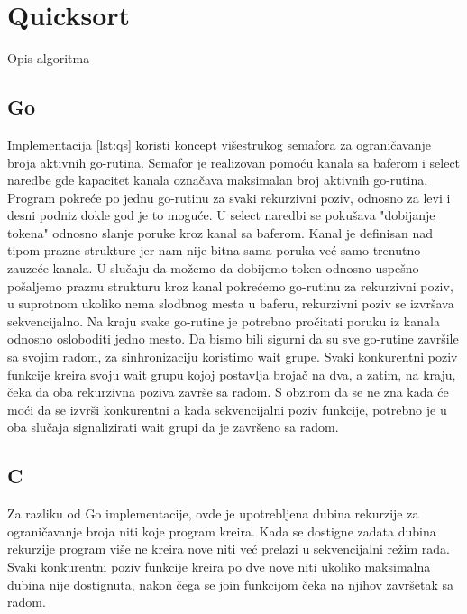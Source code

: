 \documentclass[12pt,oneside]{memoir}
\begin{document}
\section{Quicksort}
Opis algoritma

\subsection{Go}
Implementacija \ref{lst:qs} koristi koncept višestrukog semafora za ograničavanje broja aktivnih go-rutina. Semafor je realizovan pomoću kanala sa baferom i select naredbe gde kapacitet kanala označava maksimalan broj aktivnih go-rutina. Program pokreće po jednu go-rutinu za svaki rekurzivni poziv, odnosno za levi i desni podniz dokle god je to moguće. U select naredbi se pokušava "dobijanje tokena" odnosno slanje poruke kroz kanal sa baferom. Kanal je definisan nad tipom prazne strukture jer nam nije bitna sama poruka već samo trenutno zauzeće kanala. U slučaju da možemo da dobijemo token odnosno uspešno pošaljemo praznu strukturu kroz kanal pokrećemo go-rutinu za rekurzivni poziv, u suprotnom ukoliko nema slodbnog mesta u baferu, rekurzivni poziv se izvršava sekvencijalno. Na kraju svake go-rutine je potrebno pročitati poruku iz kanala odnosno osloboditi jedno mesto. Da bismo bili sigurni da su sve go-rutine završile sa svojim radom, za sinhronizaciju koristimo wait grupe. Svaki konkurentni poziv funkcije kreira svoju wait grupu kojoj postavlja brojač na dva, a zatim, na kraju, čeka da oba rekurzivna poziva završe sa radom. S obzirom da se ne zna kada će moći da se izvrši konkurentni a kada sekvencijalni poziv funkcije, potrebno je u oba slučaja signalizirati wait grupi da je završeno sa radom.

\subsection{C}
Za razliku od Go implementacije, ovde\cite{qs_c} je upotrebljena dubina rekurzije za ograničavanje broja niti koje program kreira. Kada se dostigne zadata dubina rekurzije program više ne kreira nove niti već prelazi u sekvencijalni režim rada. Svaki konkurentni poziv funkcije kreira po dve nove niti ukoliko maksimalna dubina nije dostignuta, nakon čega se join funkcijom čeka na njihov završetak sa radom.
\end{document}
